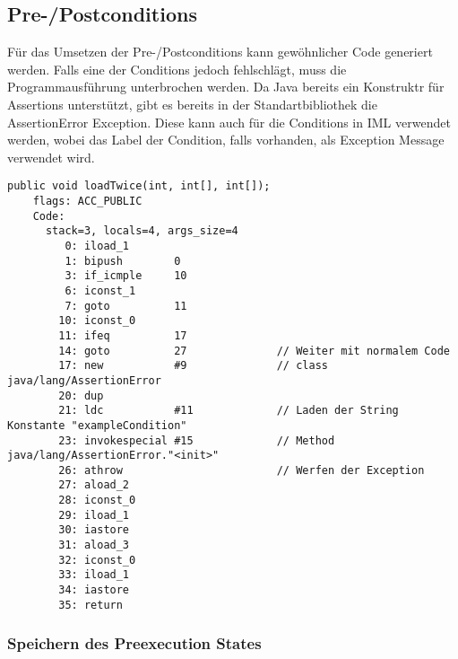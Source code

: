 \subsection{Pre-/Postconditions}

Für das Umsetzen der Pre-/Postconditions kann gewöhnlicher Code generiert werden. Falls eine der Conditions
jedoch fehlschlägt, muss die Programmausführung unterbrochen werden. Da Java bereits ein Konstruktr für 
Assertions unterstützt, gibt es bereits in der Standartbibliothek die AssertionError Exception.
Diese kann auch für die Conditions in IML verwendet werden, wobei das Label der Condition, falls vorhanden,
als Exception Message verwendet wird.
\newline

\begin{lstlisting}[caption=Bytecode der loadTwice Prozedur mit precondition,label={lst:loadtwice_code_precond}]
public void loadTwice(int, int[], int[]);
    flags: ACC_PUBLIC
    Code:
      stack=3, locals=4, args_size=4
         0: iload_1       
         1: bipush        0
         3: if_icmple     10
         6: iconst_1      
         7: goto          11
        10: iconst_0      
        11: ifeq          17
        14: goto          27              // Weiter mit normalem Code
        17: new           #9              // class java/lang/AssertionError
        20: dup         
        21: ldc           #11             // Laden der String Konstante "exampleCondition"
        23: invokespecial #15             // Method java/lang/AssertionError."<init>"
        26: athrow                        // Werfen der Exception
        27: aload_2       
        28: iconst_0      
        29: iload_1       
        30: iastore       
        31: aload_3       
        32: iconst_0      
        33: iload_1       
        34: iastore       
        35: return  
\end{lstlisting}

\subsubsection{Speichern des Preexecution States}

